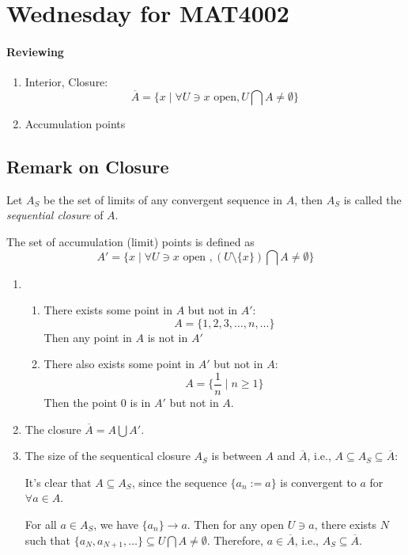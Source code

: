 \section{Wednesday for MAT4002}

\paragraph{Reviewing}
\begin{enumerate}
\item
Interior, Closure:
\[
\overline{A}=\{x\mid\forall U\ni x\text{ open}, U\bigcap A\ne\emptyset\}
\]
\item
Accumulation points
\end{enumerate}

\subsection{Remark on Closure}

\begin{definition}
Let $A_S$ be the set of limits of any convergent sequence in $A$, then $A_S$ is called the \emph{sequential closure} of $A$.
\end{definition}
\begin{definition}
The set of accumulation (limit) points is defined as
\[
A'=
\{x\mid\forall U\ni x\text{ open },(U\setminus\{x\})\bigcap A\ne\emptyset\}
\]
\end{definition}
\begin{remark}
\begin{enumerate}
\item
\begin{enumerate}
\item
There exists some point in $A$ but not in $A'$:
\[
A=\{1,2,3,\dots,n,\dots\}
\]
Then any point in $A$ is not in $A'$
\item
There also exists some point in $A'$ but not in $A$:
\[
A=\{\frac{1}{n}\mid n\ge1\}
\]
Then the point $0$ is in $A'$ but not in $A$.
\end{enumerate}
\item
The closure $\overline{A}=A\bigcup A'$.
\item
The size of the sequentical closure $A_S$ is between $A$ and $\overline{A}$, i.e., $A\subseteq A_S\subseteq\overline{A}$:

It's clear that $A\subseteq A_S$, since the sequence $\{a_n:=a\}$ is convergent to $a$ for $\forall a\in A$.

For all $a\in A_S$, we have $\{a_n\}\to a$. 
Then for any open $U\ni a$, 
there exists $N$ such that 
$\{a_N,a_{N+1},\dots\}\subseteq U\bigcap A\ne\emptyset$. 
Therefore, $a\in\overline{A}$, i.e., $A_S\subseteq\overline{A}$.
\end{enumerate}
\end{remark}

